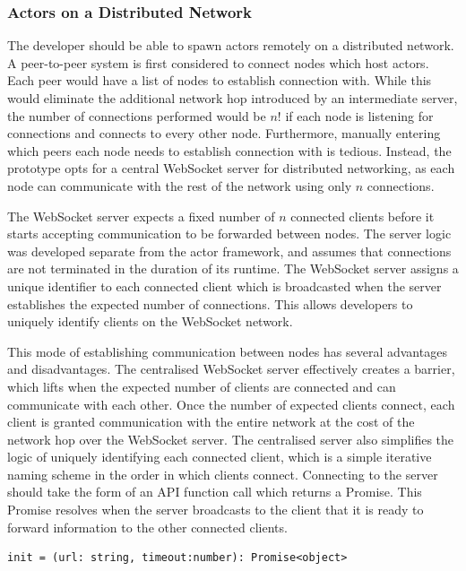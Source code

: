 \documentclass[lettersize,journal]{IEEEtran}
\begin{document}
\subsubsection{Actors on a Distributed Network}
The developer should be able to spawn actors remotely on a distributed network. A peer-to-peer system is first considered to connect nodes which host actors. Each peer would have a list of nodes to establish connection with. While this would eliminate the additional network hop introduced by an intermediate server, the number of connections performed would be $n!$ if each node is listening for connections and connects to every other node. Furthermore, manually entering which peers each node needs to establish connection with is tedious. Instead, the prototype opts for a central WebSocket server for distributed networking, as each node can communicate with the rest of the network using only $n$ connections.

The WebSocket server expects a fixed number of $n$ connected clients before it starts accepting communication to be forwarded between nodes. The server logic was developed separate from the actor framework, and assumes that connections are not terminated in the duration of its runtime. The WebSocket server assigns a unique identifier to each connected client which is broadcasted when the server establishes the expected number of connections. This allows developers to uniquely identify clients on the WebSocket network.

This mode of establishing communication between nodes has several advantages and disadvantages. The centralised WebSocket server effectively creates a barrier, which lifts when the expected number of clients are connected and can communicate with each other. Once the number of expected clients connect, each client is granted communication with the entire network at the cost of the network hop over the WebSocket server. The centralised server also simplifies the logic of uniquely identifying each connected client, which is a simple iterative naming scheme in the order in which clients connect. Connecting to the server should take the form of an API function call which returns a Promise. This Promise resolves when the server broadcasts to the client that it is ready to forward information to the other connected clients.
\begin{lstlisting}
init = (url: string, timeout:number): Promise<object>
\end{lstlisting}
\end{document}

